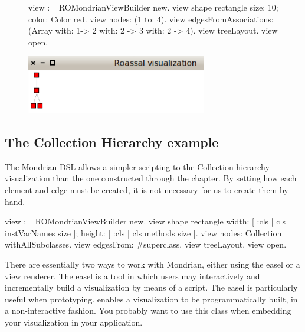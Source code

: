 \documentclass[a4paper,10pt,twoside]{book}
\begin{document}
\begin{figure}[H]
      \begin{minipage}[t]{1\textwidth}
      \vspace{0pt}
\begin{code}{}
view := ROMondrianViewBuilder new.
view shape rectangle 
	size: 10;
	color: Color red.
view nodes: (1 to: 4).
view edgesFromAssociations: (Array with: 1-> 2 with: 2 -> 3 with: 2 -> 4).
view treeLayout.
view open.
\end{code}
   \end{minipage}
   \hfill
   \begin{minipage}[t]{1\textwidth}
	 \vspace{0pt} \raggedright
       \centering
		\includegraphics[width=0.7\textwidth]{mondrian6}
   \end{minipage}
\label{fig:mondrian6}
\end{figure} 




\subsection*{The Collection Hierarchy example}

The Mondrian DSL allows a simpler scripting to the Collection hierarchy visualization than the one constructed through the chapter. By setting how each element and edge must be created, it is not necessary for us to create them by hand.

\begin{code}{}
view := ROMondrianViewBuilder new.
view shape rectangle
	width: [ :cls | cls instVarNames size ]; 
	height: [ :cls | cls methods size ].
view nodes: Collection withAllSubclasses.
view edgesFrom: #superclass.
view treeLayout.
view open.
\end{code}


There are essentially two ways to work with Mondrian, either using the easel or a view renderer. The easel is a tool in which users may interactively and incrementally build a visualization by means of a script.  The easel is particularly useful when prototyping.
 enables a visualization to be programmatically built, in a non-interactive fashion. You probably want to use this class when embedding your visualization in your application.
\end{document}
